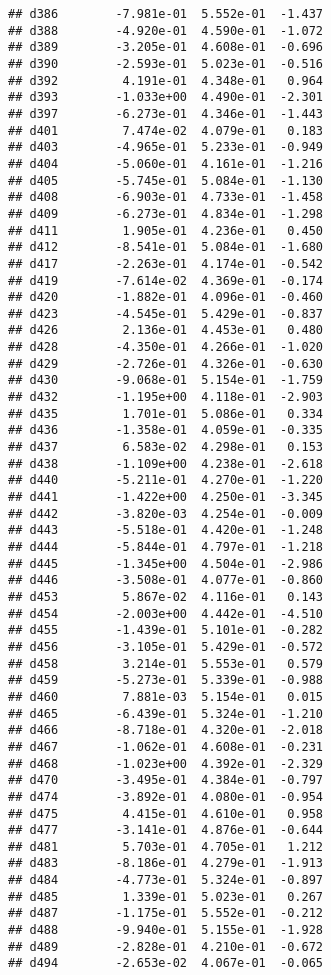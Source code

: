 \documentclass[
]{article}
\begin{document}
\begin{verbatim}
## d386        -7.981e-01  5.552e-01  -1.437
## d388        -4.920e-01  4.590e-01  -1.072
## d389        -3.205e-01  4.608e-01  -0.696
## d390        -2.593e-01  5.023e-01  -0.516
## d392         4.191e-01  4.348e-01   0.964
## d393        -1.033e+00  4.490e-01  -2.301
## d397        -6.273e-01  4.346e-01  -1.443
## d401         7.474e-02  4.079e-01   0.183
## d403        -4.965e-01  5.233e-01  -0.949
## d404        -5.060e-01  4.161e-01  -1.216
## d405        -5.745e-01  5.084e-01  -1.130
## d408        -6.903e-01  4.733e-01  -1.458
## d409        -6.273e-01  4.834e-01  -1.298
## d411         1.905e-01  4.236e-01   0.450
## d412        -8.541e-01  5.084e-01  -1.680
## d417        -2.263e-01  4.174e-01  -0.542
## d419        -7.614e-02  4.369e-01  -0.174
## d420        -1.882e-01  4.096e-01  -0.460
## d423        -4.545e-01  5.429e-01  -0.837
## d426         2.136e-01  4.453e-01   0.480
## d428        -4.350e-01  4.266e-01  -1.020
## d429        -2.726e-01  4.326e-01  -0.630
## d430        -9.068e-01  5.154e-01  -1.759
## d432        -1.195e+00  4.118e-01  -2.903
## d435         1.701e-01  5.086e-01   0.334
## d436        -1.358e-01  4.059e-01  -0.335
## d437         6.583e-02  4.298e-01   0.153
## d438        -1.109e+00  4.238e-01  -2.618
## d440        -5.211e-01  4.270e-01  -1.220
## d441        -1.422e+00  4.250e-01  -3.345
## d442        -3.820e-03  4.254e-01  -0.009
## d443        -5.518e-01  4.420e-01  -1.248
## d444        -5.844e-01  4.797e-01  -1.218
## d445        -1.345e+00  4.504e-01  -2.986
## d446        -3.508e-01  4.077e-01  -0.860
## d453         5.867e-02  4.116e-01   0.143
## d454        -2.003e+00  4.442e-01  -4.510
## d455        -1.439e-01  5.101e-01  -0.282
## d456        -3.105e-01  5.429e-01  -0.572
## d458         3.214e-01  5.553e-01   0.579
## d459        -5.273e-01  5.339e-01  -0.988
## d460         7.881e-03  5.154e-01   0.015
## d465        -6.439e-01  5.324e-01  -1.210
## d466        -8.718e-01  4.320e-01  -2.018
## d467        -1.062e-01  4.608e-01  -0.231
## d468        -1.023e+00  4.392e-01  -2.329
## d470        -3.495e-01  4.384e-01  -0.797
## d474        -3.892e-01  4.080e-01  -0.954
## d475         4.415e-01  4.610e-01   0.958
## d477        -3.141e-01  4.876e-01  -0.644
## d481         5.703e-01  4.705e-01   1.212
## d483        -8.186e-01  4.279e-01  -1.913
## d484        -4.773e-01  5.324e-01  -0.897
## d485         1.339e-01  5.023e-01   0.267
## d487        -1.175e-01  5.552e-01  -0.212
## d488        -9.940e-01  5.155e-01  -1.928
## d489        -2.828e-01  4.210e-01  -0.672
## d494        -2.653e-02  4.067e-01  -0.065

\end{verbatim}
\end{document}

